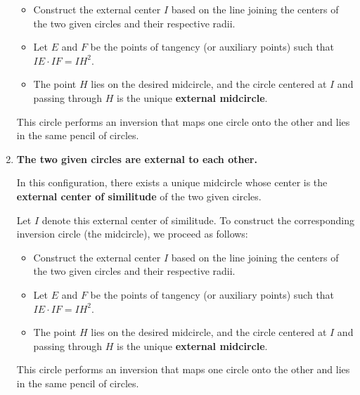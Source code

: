 \begin{enumerate}[label=(\roman*)]
\begin{itemize}
  \item Construct the external center $I$ based on the line joining the centers of the two given circles and their respective radii.
  \item Let $E$ and $F$ be the points of tangency (or auxiliary points) such that $IE \cdot IF = IH^2$.
  \item The point $H$ lies on the desired midcircle, and the circle centered at $I$ and passing through $H$ is the unique \textbf{external midcircle}.
\end{itemize}

\noindent
This circle performs an inversion that maps one circle onto the other and lies in the same pencil of circles.

\item \textbf{The two given circles are external to each other.}

In this configuration, there exists a unique midcircle whose center is the \textbf{external center of similitude} of the two given circles.

\medskip
\noindent
Let $I$ denote this external center of similitude. To construct the corresponding inversion circle (the midcircle), we proceed as follows:

\begin{itemize}
  \item Construct the external center $I$ based on the line joining the centers of the two given circles and their respective radii.
  \item Let $E$ and $F$ be the points of tangency (or auxiliary points) such that $IE \cdot IF = IH^2$.
  \item The point $H$ lies on the desired midcircle, and the circle centered at $I$ and passing through $H$ is the unique \textbf{external midcircle}.
\end{itemize}

\noindent
This circle performs an inversion that maps one circle onto the other and lies in the same pencil of circles.



\end{enumerate}
